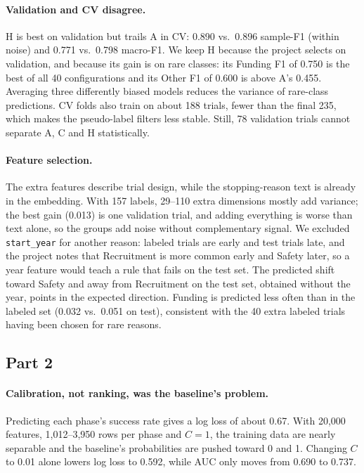 \paragraph{Validation and CV disagree.}
H is best on validation but trails A in CV: 0.890 vs.\ 0.896 sample-F1 (within noise) and 0.771 vs.\ 0.798 macro-F1.
We keep H because the project selects on validation, and because its gain is on rare classes: its Funding F1 of 0.750 is the best of all 40 configurations and its Other F1 of 0.600 is above A's 0.455.
Averaging three differently biased models reduces the variance of rare-class predictions.
CV folds also train on about 188 trials, fewer than the final 235, which makes the pseudo-label filters less stable.
Still, 78 validation trials cannot separate A, C and H statistically.

\paragraph{Feature selection.}
The extra features describe trial design, while the stopping-reason text is already in the embedding.
With 157 labels, 29--110 extra dimensions mostly add variance; the best gain (0.013) is one validation trial, and adding everything is worse than text alone, so the groups add noise without complementary signal.
We excluded \texttt{start\_year} for another reason: labeled trials are early and test trials late, and the project notes that Recruitment is more common early and Safety later, so a year feature would teach a rule that fails on the test set.
The predicted shift toward Safety and away from Recruitment on the test set, obtained without the year, points in the expected direction.
Funding is predicted less often than in the labeled set (0.032 vs.\ 0.051 on test), consistent with the 40 extra labeled trials having been chosen for rare reasons.

\subsection{Part 2}

\paragraph{Calibration, not ranking, was the baseline's problem.}
Predicting each phase's success rate gives a log loss of about 0.67.
With 20,000 features, 1,012--3,950 rows per phase and $C=1$, the training data are nearly separable and the baseline's probabilities are pushed toward 0 and 1.
Changing $C$ to 0.01 alone lowers log loss to 0.592, while AUC only moves from 0.690 to 0.737.

